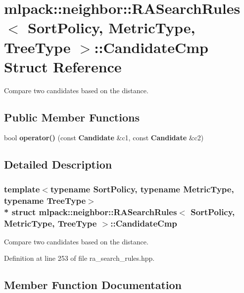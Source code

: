 \section{mlpack\+:\+:neighbor\+:\+:R\+A\+Search\+Rules$<$ Sort\+Policy, Metric\+Type, Tree\+Type $>$\+:\+:Candidate\+Cmp Struct Reference}
\label{structmlpack_1_1neighbor_1_1RASearchRules_1_1CandidateCmp}


Compare two candidates based on the distance.  


\subsection*{Public Member Functions}
\begin{DoxyCompactItemize}
\item 
bool {\bf operator()} (const {\bf Candidate} \&c1, const {\bf Candidate} \&c2)
\end{DoxyCompactItemize}


\subsection{Detailed Description}
\subsubsection*{template$<$typename Sort\+Policy, typename Metric\+Type, typename Tree\+Type$>$\\*
struct mlpack\+::neighbor\+::\+R\+A\+Search\+Rules$<$ Sort\+Policy, Metric\+Type, Tree\+Type $>$\+::\+Candidate\+Cmp}

Compare two candidates based on the distance. 

Definition at line 253 of file ra\+\_\+search\+\_\+rules.\+hpp.



\subsection{Member Function Documentation}
